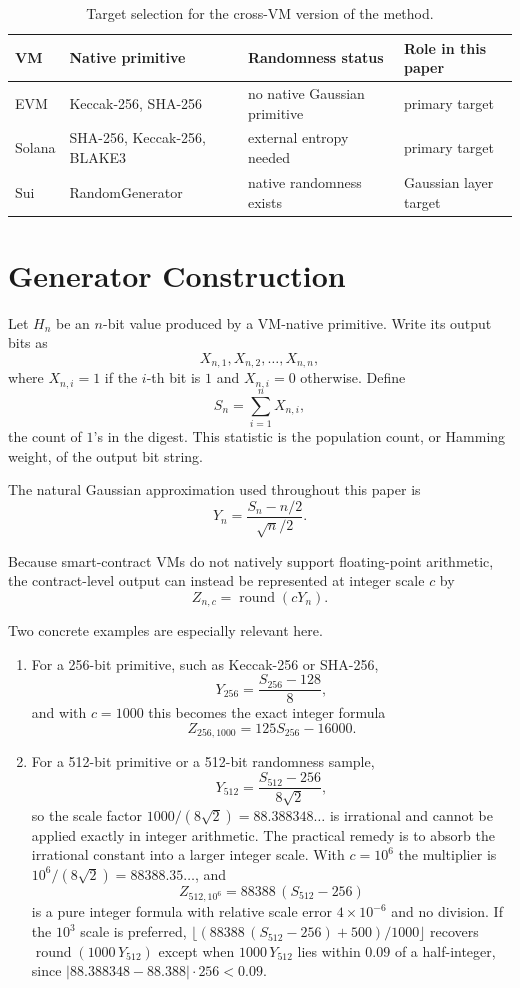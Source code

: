 \documentclass[11pt]{article}
\begin{document}
\begin{table}[htbp]
\centering
\small
\begin{tabular}{llll}
\hline
VM & Native primitive & Randomness status & Role in this paper \\
\hline
EVM & Keccak-256, SHA-256 & no native Gaussian primitive & primary target \\
Solana & SHA-256, Keccak-256, BLAKE3 & external entropy needed & primary target \\
Sui & RandomGenerator & native randomness exists & Gaussian layer target \\
\hline
\end{tabular}
\caption{Target selection for the cross-VM version of the method.}
\label{tab:vm-scope}
\end{table}

\section{Generator Construction}

Let $H_n$ be an $n$-bit value produced by a VM-native primitive. Write its
output bits as
\[
X_{n,1}, X_{n,2}, \dots, X_{n,n},
\]
where $X_{n,i} = 1$ if the $i$-th bit is $1$ and $X_{n,i} = 0$ otherwise.
Define
\[
S_n = \sum_{i=1}^{n} X_{n,i},
\]
the count of $1$'s in the digest. This statistic is the population count, or
Hamming weight, of the output bit string.

The natural Gaussian approximation used throughout this paper is
\[
Y_n = \frac{S_n - n/2}{\sqrt{n}/2}.
\]

Because smart-contract VMs do not natively support floating-point arithmetic,
the contract-level output can instead be represented at integer scale $c$ by
\[
Z_{n,c} = \operatorname{round}(cY_n).
\]

Two concrete examples are especially relevant here.
\begin{enumerate}
\item For a 256-bit primitive, such as Keccak-256 or SHA-256,
\[
Y_{256} = \frac{S_{256} - 128}{8},
\]
and with $c = 1000$ this becomes the exact integer formula
\[
Z_{256,1000} = 125S_{256} - 16000.
\]
\item For a 512-bit primitive or a 512-bit randomness sample,
\[
Y_{512} = \frac{S_{512} - 256}{8\sqrt{2}},
\]
so the scale factor $1000/(8\sqrt{2}) = 88.388348\ldots$ is irrational and
cannot be applied exactly in integer arithmetic. The practical remedy is to
absorb the irrational constant into a larger integer scale. With
$c = 10^{6}$ the multiplier is $10^{6}/(8\sqrt{2}) = 88388.35\ldots$, and
\[
Z_{512,10^{6}} = 88388\,(S_{512}-256)
\]
is a pure integer formula with relative scale error $4\times10^{-6}$ and no
division. If the $10^{3}$ scale is preferred, $\lfloor(88388\,(S_{512}-256) +
500)/1000\rfloor$ recovers $\operatorname{round}(1000\,Y_{512})$ except when
$1000\,Y_{512}$ lies within $0.09$ of a half-integer, since
$|88.388348-88.388|\cdot 256 < 0.09$.
\end{enumerate}
\end{document}

